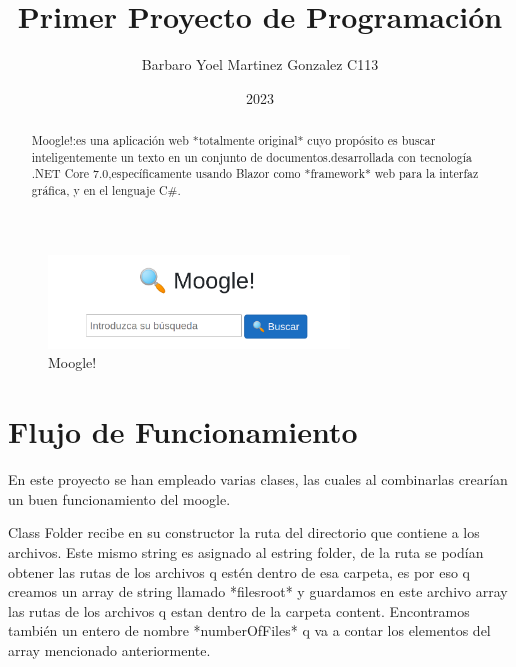 \documentclass[a4paper,12pt]{article}
\begin{document}
\title{Primer Proyecto de Programación}
\author{Barbaro Yoel Martinez Gonzalez C113}
\date{2023}
\maketitle



 \begin{abstract}
 Moogle!:es una aplicación web *totalmente original* cuyo propósito es buscar inteligentemente un texto en un conjunto
de documentos.desarrollada con tecnología .NET Core 7.0,específicamente usando Blazor como *framework* web para la interfaz
gráfica, y en el lenguaje C$\#$.
\end{abstract}

\begin{figure}[h]
	\center
	\includegraphics[width=8cm]{moogle.png}
	\caption{Moogle!}
	\label{fig:logo}
\end{figure}


\section{Flujo de Funcionamiento}

En este proyecto se han empleado varias clases, las cuales al combinarlas crearían un buen funcionamiento del moogle.

Class Folder recibe en su constructor la ruta del directorio que contiene a los archivos. Este mismo string es asignado al estring folder, de la ruta se podían obtener las rutas de los archivos q estén dentro de esa carpeta, es por eso q creamos un array de string llamado *filesroot* y guardamos en este archivo array las rutas de los archivos q estan dentro de la carpeta content. Encontramos también un entero de nombre *numberOfFiles* q va a contar los elementos del array mencionado anteriormente. 
\end{document}
